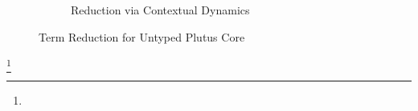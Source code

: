 \documentclass[../plutus-core-specification.tex]{subfiles}
\begin{document}
\begin{figure}[H]
\begin{subfigure}[c]{\linewidth}
    \begin{prooftree}
    \end{prooftree}

    \begin{prooftree}
    \end{prooftree}

    \caption{Reduction via Contextual Dynamics}
    \label{fig:untyped-reduction}
\end{subfigure}
\caption{Term Reduction for Untyped Plutus Core}
\label{fig:untyped-term-reduction}
\end{figure}

\footnote[2]{}
\end{document}
